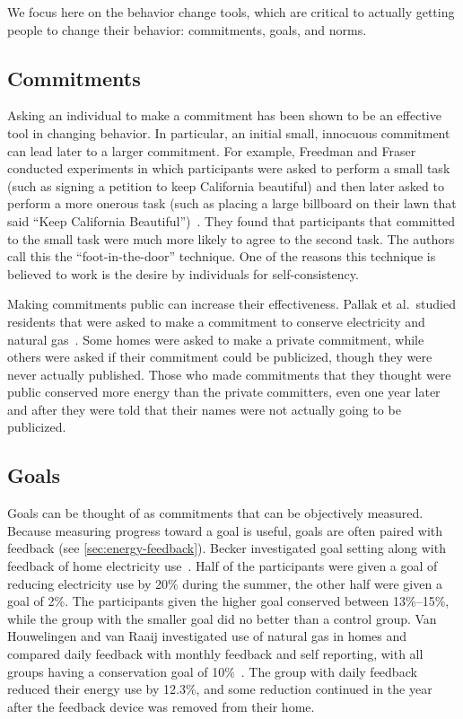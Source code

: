 We focus here on the behavior change tools, which are critical to actually getting people to change their behavior: commitments, goals, and norms.

\subsection{Commitments}
\label{sec:rl-commitments}

Asking an individual to make a commitment has been shown to be an effective tool in changing behavior. In particular, an initial small, innocuous commitment can lead later to a larger commitment. For example, Freedman and Fraser conducted experiments in which participants were asked to perform a small task (such as signing a petition to keep California beautiful) and then later asked to perform a more onerous task (such as placing a large billboard on their lawn that said ``Keep California Beautiful'')~\cite{Freedman66}. They found that participants that committed to the small task were much more likely to agree to the second task. The authors call this the ``foot-in-the-door'' technique. One of the reasons this technique is believed to work is the desire by individuals for self-consistency.

Making commitments public can increase their effectiveness. Pallak et al.\ studied residents that were asked to make a commitment to conserve electricity and natural gas~\cite{Pallak80}. Some homes were asked to make a private commitment, while others were asked if their commitment could be publicized, though they were never actually published. Those who made commitments that they thought were public conserved more energy than the private committers, even one year later and after they were told that their names were not actually going to be publicized.

\subsection{Goals}
\label{sec:goals}

Goals can be thought of as commitments that can be objectively measured. Because measuring progress toward a goal is useful, goals are often paired with feedback (see \autoref{sec:energy-feedback}). Becker investigated goal setting along with feedback of home electricity use~\cite{Becker78}. Half of the participants were given a goal of reducing electricity use by 20\% during the summer, the other half were given a goal of 2\%. The participants given the higher goal conserved between 13\%--15\%, while the group with the smaller goal did no better than a control group. Van Houwelingen and van Raaij investigated use of natural gas in homes and compared daily feedback with monthly feedback and self reporting, with all groups having a conservation goal of 10\%~\cite{Houwelingen89}. The group with daily feedback reduced their energy use by 12.3\%, and some reduction continued in the year after the feedback device was removed from their home.

